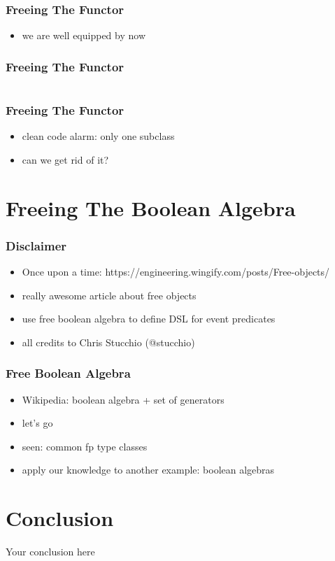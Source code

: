\documentclass{beamer}
\begin{document}
\begin{frame}[fragile]
  \frametitle{Freeing The Functor}
  \begin{itemize}
  \item we are well equipped by now
  \end{itemize}
\end{frame}

\begin{frame}[fragile]
  \frametitle{Freeing The Functor}
  \inputminted{scala}{snippets/free-functor.scala}
\end{frame}

\begin{frame}[fragile]
  \frametitle{Freeing The Functor}
  \begin{itemize}
  \item clean code alarm: only one subclass
  \item can we get rid of it?
  \end{itemize}
\end{frame}

\section{Freeing The Boolean Algebra}\label{sec:free-boolean-algebra}

\begin{frame}
  \frametitle{Disclaimer}
  \begin{itemize}
  \item Once upon a time: https://engineering.wingify.com/posts/Free-objects/
  \item really awesome article about free objects
  \item use free boolean algebra to define DSL for event predicates
  \item all credits to Chris Stucchio (@stucchio)
  \end{itemize}
\end{frame}

\begin{frame}
  \frametitle{Free Boolean Algebra}
  \begin{itemize}
  \item Wikipedia: boolean algebra + set of generators
  \item let's go
  \end{itemize}
\end{frame}

\begin{frame}
  \begin{itemize}
  \item seen: common fp type classes
  \item apply our knowledge to another example: boolean algebras
  \end{itemize}
\end{frame}

\section{Conclusion}\label{sec:conclusion}

\begin{frame}
  \begin{center}
    \huge
    Your conclusion here
  \end{center}
\end{frame}
\end{document}
